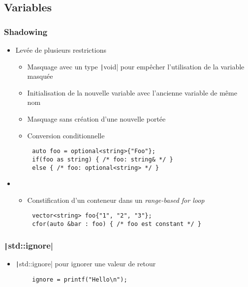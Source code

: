 \documentclass[C++.tex]{subfiles}
\begin{document}
\subsection*{Variables}
\begin{frame}[fragile]
	\frametitle{Shadowing}
	\begin{itemize}
		\item Levée de plusieurs restrictions
		\begin{itemize}
			\item Masquage avec un type \texttt|void| pour empêcher l'utilisation de la variable masquée
			\item Initialisation de la nouvelle variable avec l'ancienne variable de même nom
			\item Masquage sans création d'une nouvelle portée
			\item Conversion conditionnelle
		\end{itemize}
	\end{itemize}

	\begin{verbatim}
		auto foo = optional<string>{"Foo"};
		if(foo as string) { /* foo: string& */ }
		else { /* foo: optional<string> */ }
	\end{verbatim}

	\begin{itemize}
		\item []
		\begin{itemize}
			\item Constification d'un conteneur dans un \textit{range-based for loop}
		\end{itemize}
	\end{itemize}

	\begin{verbatim}
		vector<string> foo{"1", "2", "3"};
		cfor(auto &bar : foo) { /* foo est constant */ }
	\end{verbatim}

\end{frame}

\begin{frame}[fragile]
	\frametitle{\texttt|std::ignore|}
	\begin{itemize}
		\item \texttt|std::ignore| pour ignorer une valeur de retour
	\end{itemize}

	\begin{verbatim}
		ignore = printf("Hello\n");
	\end{verbatim}

\end{frame}
\end{document}
